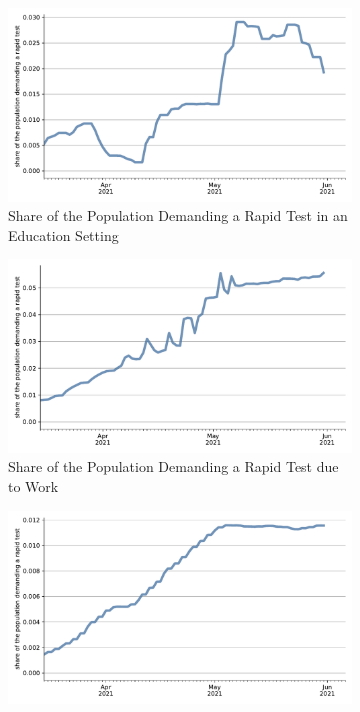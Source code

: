 \begin{figure}[ht]
  \centering
  \begin{subfigure}[b]{0.425\textwidth}
    \centering
    \includegraphics[width=\textwidth]{figures/results/figures/rapid_test_statistics/educ_demand_share}
    \caption{Share of the Population Demanding a Rapid Test in an Education Setting}
    \label{fig:educ_rapid_test_demand}
  \end{subfigure}
  \hfill
  \begin{subfigure}[b]{0.425\textwidth}
    \centering
    \includegraphics[width=\textwidth]{figures/results/figures/rapid_test_statistics/work_demand_share}
    \caption{Share of the Population Demanding a Rapid Test due to Work}
    \label{fig:work_rapid_test_demand}
  \end{subfigure}
  \hfill
  \begin{subfigure}[b]{0.425\textwidth}
    \centering
    \includegraphics[width=\textwidth]{figures/results/figures/rapid_test_statistics/private_demand_share}

\end{subfigure}
\end{figure}
